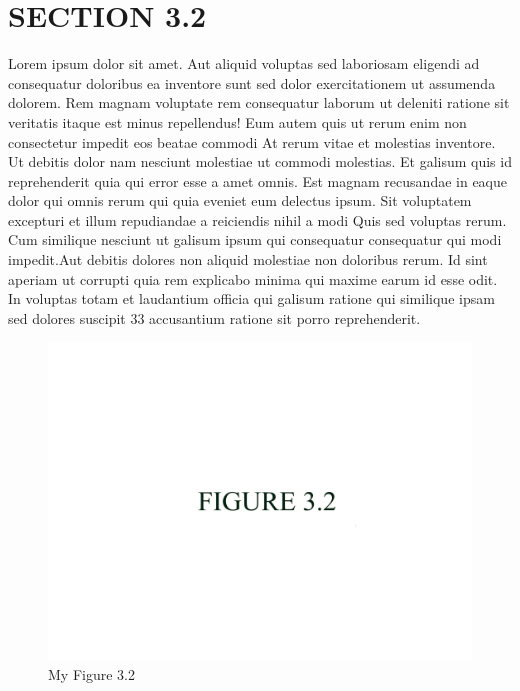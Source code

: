 \documentclass[a4paper,12pt]{report}
\begin{document}
\section{SECTION 3.2}
\hspace{.5cm} Lorem ipsum dolor sit amet. Aut aliquid voluptas sed laboriosam eligendi ad consequatur doloribus ea inventore sunt sed dolor exercitationem ut assumenda dolorem. Rem magnam voluptate rem consequatur laborum ut deleniti ratione sit veritatis itaque est minus repellendus! Eum autem quis ut rerum enim non consectetur impedit eos beatae commodi At rerum vitae et molestias inventore. Ut debitis dolor nam nesciunt molestiae ut commodi molestias. Et galisum quis id reprehenderit quia qui error esse a amet omnis. Est magnam recusandae in eaque dolor qui omnis rerum qui quia eveniet eum delectus ipsum. Sit voluptatem excepturi et illum repudiandae a reiciendis nihil a modi Quis sed voluptas rerum. Cum similique nesciunt ut galisum ipsum qui consequatur consequatur qui modi impedit.Aut debitis dolores non aliquid molestiae non doloribus rerum. Id sint aperiam ut corrupti quia rem explicabo minima qui maxime earum id esse odit. In voluptas totam et laudantium officia qui galisum ratione qui similique ipsam sed dolores suscipit 33 accusantium ratione sit porro reprehenderit.

\begin{figure}[h]
        \centering
        \includegraphics[width=12cm]{fig_3.2.jpg}
        \caption{My Figure 3.2}
        \label{fig:my_label}
\end{figure}
\end{document}
